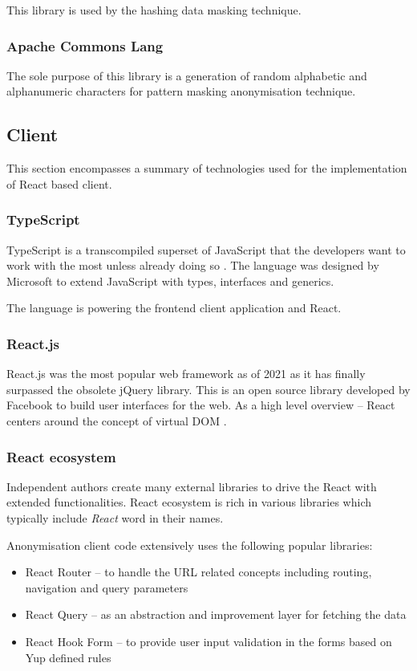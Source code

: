 \documentclass[a4paper,twoside,12pt]{book}
\begin{document}
This library is used by the hashing data masking technique.

\subsubsection{Apache Commons Lang}

The sole purpose of this library is a generation of random alphabetic and alphanumeric characters for pattern masking anonymisation technique.

\subsection{Client}

This section encompasses a summary of technologies used for the implementation of React based client.

\subsubsection{TypeScript}

TypeScript is a transcompiled superset of JavaScript that the developers want to work with the most unless already doing so \cite{bib:stackoverflow2021}. The language was designed by Microsoft to extend JavaScript with types, interfaces and generics.

The language is powering the frontend client application and React.

\subsubsection{React.js}

React.js was the most popular web framework as of 2021 \cite{bib:stackoverflow2021} as it has finally surpassed the obsolete jQuery library. This is an open source library developed by Facebook to build user interfaces for the web. As a high level overview – React centers around the concept of virtual DOM \cite{bib:modern_fullstack}.

\subsubsection{React ecosystem}

Independent authors create many external libraries to drive the React with extended functionalities. React ecosystem is rich in various libraries which typically include \textit{React} word in their names.

Anonymisation client code extensively uses the following popular libraries:
\begin{itemize}
\item React Router – to handle the URL related concepts including routing, navigation and query parameters
\item React Query – as an abstraction and improvement layer for fetching the data
\item React Hook Form – to provide user input validation in the forms based on Yup defined rules
\end{itemize}
\end{document}

